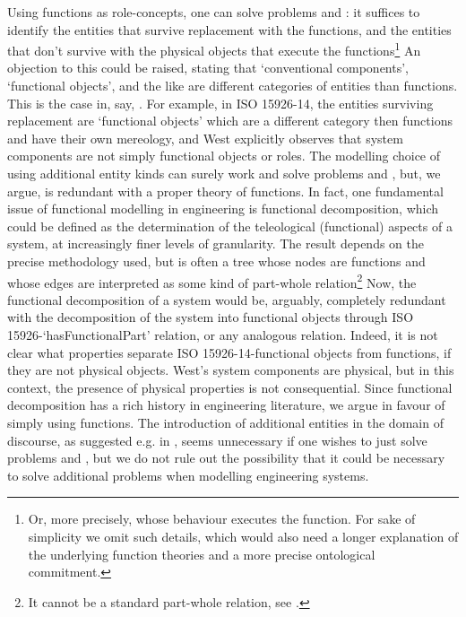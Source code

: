 \documentclass[
]{ceurart}
\begin{document}
Using functions as role-concepts, one can solve problems  and : it suffices to identify the entities that survive replacement with the functions, and the entities that don't survive with the physical objects that execute the functions\footnote{Or, more precisely, whose behaviour executes the function. For sake of simplicity we omit such details, which would also need a longer explanation of the underlying function theories and a more precise ontological commitment.} 
An objection to this could be raised, stating that `conventional components', `functional objects', and the like are different categories of entities than functions. This is the case in, say, \cite{westDevelopingHighQuality2011,guarinoArtefactualSystemsMissing2014,kluwerISO159261420202020}. For example, in ISO 15926-14, the entities surviving replacement are `functional objects' which are a different category then functions and have their own mereology, and West \cite{westDevelopingHighQuality2011} explicitly observes that system components are not simply functional objects or roles. 
The modelling choice of using additional entity kinds can surely work and solve problems  and , but, we argue, is redundant with a proper theory of functions. 
In fact, one fundamental issue of functional modelling in engineering is functional decomposition, which could be defined as the determination of the teleological (functional) aspects of a system, at increasingly finer levels of granularity. The result depends on the precise methodology used, but is often a tree whose nodes are functions and whose edges are interpreted as some kind of part-whole relation\footnote{It cannot be a standard part-whole relation, see \cite{vermaasFormalImpossibilityAnalysing2013}.}
Now, the functional decomposition of a system would be, arguably, completely redundant with the decomposition of the system into functional objects through ISO 15926-`hasFunctionalPart' relation, or any analogous relation. Indeed, it is not clear what properties separate ISO 15926-14-functional objects from functions, if they are not physical objects. West's system components are physical, but in this context, the presence of physical properties is not consequential. %
Since functional decomposition has a rich history in engineering literature, we argue in favour of simply using functions.
The introduction of additional entities in the domain of discourse, as suggested e.g. in \cite{westDevelopingHighQuality2011,guarinoArtefactualSystemsMissing2014}, seems unnecessary if one wishes to just solve problems  and , but we do not rule out the possibility that it could be necessary to solve additional problems when modelling engineering systems.
\end{document}
